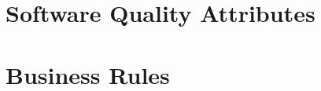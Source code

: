 \section{Software Quality Attributes}
\begin{comment}
	$<$Specify any additional quality characteristics for the product that will be 
	important to either the customers or the developers. Some to consider are: 
	adaptability, availability, correctness, flexibility, interoperability, 
	maintainability, portability, reliability, reusability, robustness, testability, 
	and usability. Write these to be specific, quantitative, and verifiable when 
	possible. At the least, clarify the relative preferences for various attributes, 
	such as ease of use over ease of learning.$>$
\end{comment}

\section{Business Rules}
	\begin{comment}
		$<$List any operating principles about the product, such as which individuals or 
		roles can perform which functions under specific circumstances. These are not 
		functional requirements in themselves, but they may imply certain functional 
		requirements to enforce the rules.$>$
	\end{comment}
